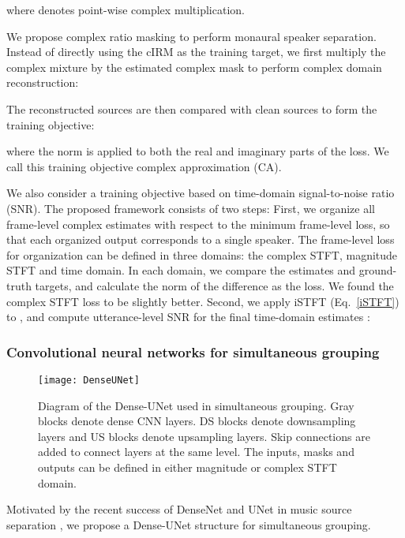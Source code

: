 \documentclass[journal]{IEEEtran}
\begin{document}
where  denotes point-wise complex multiplication. 


We propose complex ratio masking to perform monaural speaker separation.
Instead of directly using the cIRM as the training target, we first multiply the complex mixture by the estimated complex mask  to perform complex domain reconstruction:

The reconstructed sources are then compared with clean sources to form the training objective:

where the  norm is applied to both the real and imaginary parts of the loss.
We call this training objective complex approximation (CA).


We also consider a training objective based on time-domain signal-to-noise ratio (SNR).
The proposed framework consists of two steps:
First, we organize all frame-level complex estimates  with respect to the minimum frame-level loss, so that each organized output  corresponds to a single speaker. The frame-level loss for organization can be defined in three domains: the complex STFT, magnitude STFT and time domain. 
In each domain, we compare the estimates and ground-truth targets, and calculate the  norm of the difference as the loss.
We found the complex STFT loss to be slightly better.
Second, we apply iSTFT (Eq.~\ref{iSTFT}) to , and compute utterance-level SNR for the final time-domain estimates :






\subsubsection{Convolutional neural networks for simultaneous grouping}
\label{sec:4.1.3}
    \begin{figure}[]
\begin{minipage}[a]{\linewidth}
      \centering
      \centerline{\texttt{[image: DenseUNet]}}
    \medskip
    \end{minipage}
\caption{Diagram of the Dense-UNet used in simultaneous grouping. Gray blocks denote dense CNN layers. DS blocks denote downsampling layers and US blocks denote upsampling layers. Skip connections are added to connect layers at the same level. The inputs, masks and outputs can be defined in either magnitude or complex STFT domain.}
    \label{fig:unet}
\end{figure}
    
Motivated by the recent success of DenseNet \cite{DENSE} and UNet \cite{UNET0} in music source separation \cite{UNET1} \cite{MM}, we propose a Dense-UNet structure for simultaneous grouping.
\end{document}

